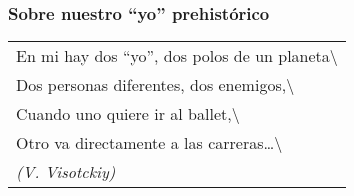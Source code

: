 \protect\hypertarget{M7}{}{}

\subsubsection{\texorpdfstring{Sobre nuestro ``yo''
prehistórico}{Sobre nuestro yo prehistórico}}\label{sobre-nuestro-yo-prehistuxf3rico}

\begin{longtable}[]{@{}l@{}}
\toprule
En mi hay dos ``yo'', dos polos de un
planeta\textbackslash{}\tabularnewline
Dos personas diferentes, dos enemigos,\textbackslash{}\tabularnewline
Cuando uno quiere ir al ballet,\textbackslash{}\tabularnewline
Otro va directamente a las
carreras\ldots{}\textbackslash{}\tabularnewline
\emph{(V. Visotckiy)}\tabularnewline
\bottomrule
\end{longtable}


